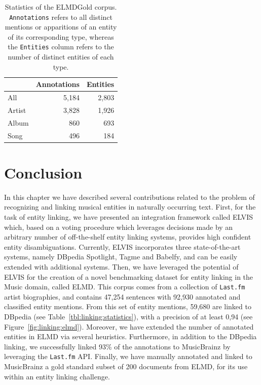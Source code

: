 \begin{table}[]
\centering
\begin{tabular}{| l| r |r |}
\hline
& \textbf{Annotations} & \textbf{Entities} \\ \hline
All    & 5,184      & 2,803    \\ \hline
Artist & 3,828      & 1,926    \\ \hline
Album  & 860       & 693    \\ \hline
Song  & 496        & 184     \\ \hline
\end{tabular}
\caption{Statistics of the ELMDGold corpus. \texttt{Annotations} refers to all distinct mentions or apparitions of an entity of its corresponding type, whereas the \texttt{Entities} column refers to the number of distinct entities of each type.}
\label{tbl:linking:ELMDGold}
\end{table}


\section{Conclusion}
\label{sec:linking:conclusions}

In this chapter we have described several contributions related to the problem of recognizing and linking musical entities in naturally occurring text. First, for the task of entity linking, we have presented an integration framework called \textsc{ELVIS} which, based on a voting procedure which leverages decisions made by an arbitrary number of off-the-shelf entity linking systems, provides high confident entity disambiguations. Currently, \textsc{ELVIS} incorporates three state-of-the-art systems, namely DBpedia Spotlight, Tagme and Babelfy, and can be easily extended with additional systems. %
Then, we have leveraged the potential of \textsc{ELVIS} for the creation of a novel benchmarking dataset for entity linking in the Music domain, called \textsc{ELMD}. This corpus comes from a collection of \texttt{Last.fm} artist biographies, and contains 47,254 sentences with 92,930 annotated and classified entity mentions. %
From this set of entity mentions, 59,680 are linked to DBpedia (see Table~\ref{tbl:linking:statistics}), with a precision of at least 0,94 (see Figure~\ref{fig:linking:elmd}).
Moreover, we have extended the number of annotated entities in ELMD via several heuristics. Furthermore, in addition to the DBpedia linking, we successfully linked 93\% of the annotations to MusicBrainz by leveraging the \texttt{Last.fm} API.
Finally, we have manually annotated and linked to MusicBrainz a gold standard subset of 200 documents from ELMD, for its use within an entity linking challenge.
